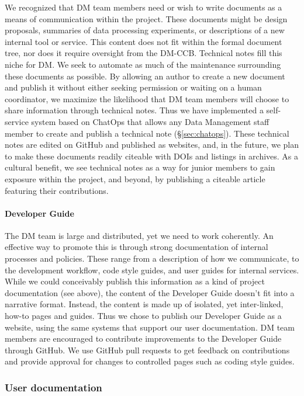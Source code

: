 We recognized that DM team members need or wish  to write documents as a means of communication within the project.
These documents might be design proposals, summaries of data processing experiments, or descriptions of a new internal tool or service.
This content does not fit within the formal document tree, nor does it require oversight from the DM-CCB.
Technical notes fill this niche for DM.
We seek to automate as much of the maintenance surrounding these documents as possible.
By allowing an author to create a new document and publish it without either seeking permission or waiting on a human coordinator, we maximize the likelihood that DM team members will choose to share information through technical notes.
Thus we have implemented a self-service system based on ChatOps that allows any Data Management staff member to create and publish a technical note (\S\ref{sec:chatops}).
These technical notes are edited on GitHub and published as websites, and, in the future, we plan to make these documents readily citeable with DOIs and listings in archives.
As a cultural benefit, we see technical notes as a way for junior members to gain exposure within the project, and beyond, by publishing a citeable article featuring their contributions.

\paragraph{Developer Guide}

The DM team is large and distributed, yet we need to work coherently.
An effective way to promote this is through strong documentation of internal processes and policies.
These range from a description of how we communicate, to the development workflow, code style guides, and user guides for internal services.
While we could conceivably publish this information as a kind of project documentation (see above), the content of the Developer Guide doesn't fit into a narrative format.
Instead, the content is made up of isolated, yet inter-linked, how-to pages and guides.
Thus we chose to publish our Developer Guide as a website,\cite{devguide} using the same systems that support our user documentation.
DM team members are encouraged to contribute improvements to the Developer Guide through GitHub.
We use GitHub pull requests to get feedback on contributions and provide approval for changes to controlled pages such as coding style guides.

\subsubsection{User documentation}
\label{sec:user_docs}

